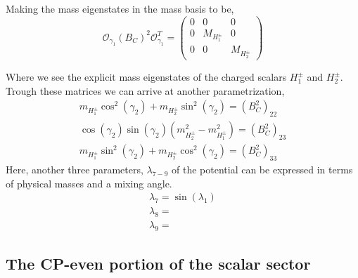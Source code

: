 Making the mass eigenstates in the mass basis to be, 
\begin{equation}
\mathcal{O}_{\gamma_1} \left( B_C \right)^2 \mathcal{O}_{\gamma_1}^T   = \begin{pmatrix}
0 & 0 & 0 \\ 
0 & M_{H_1^\pm} & 0 \\ 
0 & 0 & M_{H_2^\pm}
\end{pmatrix} 
\end{equation}
\begin{comment}
{ \color{red} Power gap }

Both the equations for the diagonalized masses can be utilized to reach a parametrization of some scalar couplings,
\begin{equation}
\begin{split} 
\lambda_7 = \\
\lambda_8 = \\
\lambda_9 = 
\end{split} 
\end{equation}
Further combination with the equation for $\mu_{23}$ and $\lambda_{10}$ yields more terms of the potential expressed as a function of physical masses and respective mixing angles. 
\end{comment} 
Where we see the explicit mass eigenstates of the charged scalars $H^\pm_1$ and $H^\pm_2$. Trough these matrices we can arrive at another parametrization, 
\begin{equation}
\begin{split}
m_{H^\pm_1} \cos^2(\gamma_2) + m_{H^\pm_2}  \sin^2(\gamma_2) = \left( B_C^2 \right)_{22}   \\
\cos(\gamma_2)\sin(\gamma_2)( m_{H^\pm_2}^2 - m_{H^\pm_1}^2  )  = \left( B_C^2 \right)_{23} \\ 
m_{H^\pm_1} \sin^2(\gamma_2) + m_{H^\pm_2}  \cos^2(\gamma_2) = \left( B_C^2 \right)_{33}
\end{split} 
\end{equation}
Here, another three parameters, $\lambda_{7-9}$ of the potential can be expressed in terms of physical masses and a mixing angle.
\begin{equation}
\begin{gathered}
\lambda_7 = \sin(\lambda_1) \\
\lambda_8 = \\
\lambda_9 = 
\end{gathered}
\end{equation}


\subsection{The CP-even portion of the scalar sector}

